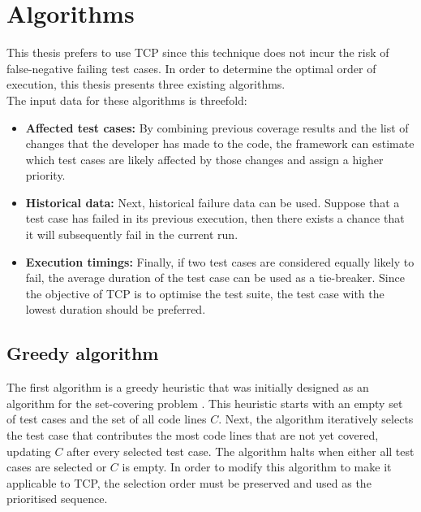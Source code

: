 \section{Algorithms}
\noindent This thesis prefers to use TCP since this technique does not incur the risk of false-negative failing test cases. In order to determine the optimal order of execution, this thesis presents three existing algorithms.\\

\noindent The input data for these algorithms is threefold:\\

\begin{itemize}
\item \textbf{Affected test cases:} By combining previous coverage results and the list of changes that the developer has made to the code, the framework can estimate which test cases are likely affected by those changes and assign a higher priority.

\item \textbf{Historical data:} Next, historical failure data can be used. Suppose that a test case has failed in its previous execution, then there exists a chance that it will subsequently fail in the current run.

\item \textbf{Execution timings:} Finally, if two test cases are considered equally likely to fail, the average duration of the test case can be used as a tie-breaker. Since the objective of TCP is to optimise the test suite, the test case with the lowest duration should be preferred.
\end{itemize}

\subsection{Greedy algorithm}
\noindent The first algorithm is a greedy heuristic that was initially designed as an algorithm for the set-covering problem \cite{evaluationoftestsuiteminimization}. This heuristic starts with an empty set of test cases and the set of all code lines $C$. Next, the algorithm iteratively selects the test case that contributes the most code lines that are not yet covered, updating $C$ after every selected test case. The algorithm halts when either all test cases are selected or $C$ is empty. In order to modify this algorithm to make it applicable to TCP, the selection order must be preserved and used as the prioritised sequence.

